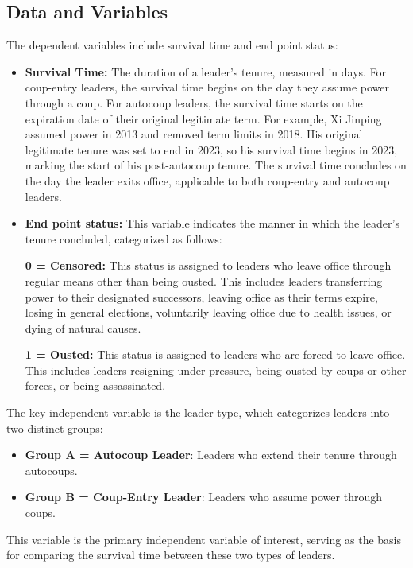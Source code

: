 \documentclass[
  12pt,
]{report}
\providecommand{\tightlist}{%
  \setlength{\itemsep}{0pt}\setlength{\parskip}{0pt}}\usepackage{longtable,booktabs,array}
\begin{document}
\subsection{Data and Variables}\label{data-and-variables}

The dependent variables include survival time and end point status:

\begin{itemize}
\item
  \textbf{Survival Time:} The duration of a leader's tenure, measured in
  days. For coup-entry leaders, the survival time begins on the day they
  assume power through a coup. For autocoup leaders, the survival time
  starts on the expiration date of their original legitimate term. For
  example, Xi Jinping assumed power in 2013 and removed term limits in
  2018. His original legitimate tenure was set to end in 2023, so his
  survival time begins in 2023, marking the start of his post-autocoup
  tenure. The survival time concludes on the day the leader exits
  office, applicable to both coup-entry and autocoup leaders.
\item
  \textbf{End point status:} This variable indicates the manner in which
  the leader's tenure concluded, categorized as follows:

  \textbf{0 = Censored:} This status is assigned to leaders who leave
  office through regular means other than being ousted. This includes
  leaders transferring power to their designated successors, leaving
  office as their terms expire, losing in general elections, voluntarily
  leaving office due to health issues, or dying of natural causes.

  \textbf{1 = Ousted:} This status is assigned to leaders who are forced
  to leave office. This includes leaders resigning under pressure, being
  ousted by coups or other forces, or being assassinated.
\end{itemize}

The key independent variable is the leader type, which categorizes
leaders into two distinct groups:

\begin{itemize}
\tightlist
\item
  \textbf{Group A = Autocoup Leader}: Leaders who extend their tenure
  through autocoups.
\item
  \textbf{Group B = Coup-Entry Leader}: Leaders who assume power through
  coups.
\end{itemize}

This variable is the primary independent variable of interest, serving
as the basis for comparing the survival time between these two types of
leaders.
\end{document}
